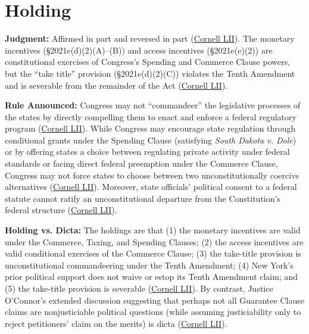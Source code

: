 \documentclass[12pt]{article}
\begin{document}
\section{Holding}

\textbf{Judgment:} Affirmed in part and reversed in part (\href{https://www.law.cornell.edu/supremecourt/text/505/144}{Cornell LII}). The monetary incentives (\S 2021e(d)(2)(A)--(B)) and access incentives (\S 2021e(e)(2)) are constitutional exercises of Congress's Spending and Commerce Clause powers, but the ``take title'' provision (\S 2021e(d)(2)(C)) violates the Tenth Amendment and is severable from the remainder of the Act (\href{https://www.law.cornell.edu/supremecourt/text/505/144}{Cornell LII}).

\textbf{Rule Announced:} Congress may not ``commandeer'' the legislative processes of the states by directly compelling them to enact and enforce a federal regulatory program (\href{https://www.law.cornell.edu/supremecourt/text/505/144}{Cornell LII}). While Congress may encourage state regulation through conditional grants under the Spending Clause (satisfying \textit{South Dakota v. Dole}) or by offering states a choice between regulating private activity under federal standards or facing direct federal preemption under the Commerce Clause, Congress may not force states to choose between two unconstitutionally coercive alternatives (\href{https://www.law.cornell.edu/supremecourt/text/505/144}{Cornell LII}). Moreover, state officials' political consent to a federal statute cannot ratify an unconstitutional departure from the Constitution's federal structure (\href{https://www.law.cornell.edu/supremecourt/text/505/144}{Cornell LII}).

\textbf{Holding vs. Dicta:} The holdings are that (1) the monetary incentives are valid under the Commerce, Taxing, and Spending Clauses; (2) the access incentives are valid conditional exercises of the Commerce Clause; (3) the take-title provision is unconstitutional commandeering under the Tenth Amendment; (4) New York's prior political support does not waive or estop its Tenth Amendment claim; and (5) the take-title provision is severable (\href{https://www.law.cornell.edu/supremecourt/text/505/144}{Cornell LII}). By contrast, Justice O'Connor's extended discussion suggesting that perhaps not all Guarantee Clause claims are nonjusticiable political questions (while assuming justiciability only to reject petitioners' claim on the merits) is dicta (\href{https://www.law.cornell.edu/supremecourt/text/505/144}{Cornell LII}).
\end{document}
